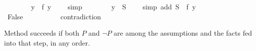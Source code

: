\begin{isabellebody}
\ \ \ \ \ \ \isamarkupfalse%
\ {\isachardoublequoteopen}y\ {\isasymin}\ f\ y{\isachardoublequoteclose}\ \ \ \isamarkupfalse%
\ simp\isanewline
\ \ \ \ \ \ \isamarkupfalse%
\ {\isachardoublequoteopen}y\ {\isasymin}\ {\isacharquery}S{\isachardoublequoteclose}\ \ \ \ \isamarkupfalse%
{\isacharparenleft}simp\ add{\isacharcolon}\ {\isacharbackquoteopen}{\isacharquery}S\ {\isacharequal}\ f\ y{\isacharbackquoteclose}{\isacharparenright}\isanewline
\ \ \ \ \ \ \isamarkupfalse%
\ False\ \ \ \ \ \ \ \ \ \isamarkupfalse%
\ contradiction\isanewline
\ \ \ \ \isamarkupfalse%
\isanewline
\ \ \isamarkupfalse%
\isanewline
{}\isamarkupfalse%
%
\endisatagproof
{\isafoldproof}%
%
\isadelimproof
%
\endisadelimproof
%
\begin{isamarkuptext}%
\noindent Method  succeeds if both $P$ and
$\neg P$ are among the assumptions and the facts fed into that step, in any order.


\end{isamarkuptext}
\end{isabellebody}
